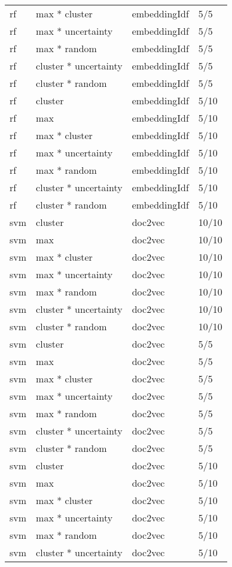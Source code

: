 \documentclass[12pt,twoside]{reedthesis}
\begin{document}
\begin{longtable}{llll}
rf & max * cluster & embeddingIdf & 5/5\\
rf & max * uncertainty & embeddingIdf & 5/5\\
\addlinespace
rf & max * random & embeddingIdf & 5/5\\
rf & cluster * uncertainty & embeddingIdf & 5/5\\
rf & cluster * random & embeddingIdf & 5/5\\
rf & cluster & embeddingIdf & 5/10\\
rf & max & embeddingIdf & 5/10\\
\addlinespace
rf & max * cluster & embeddingIdf & 5/10\\
rf & max * uncertainty & embeddingIdf & 5/10\\
rf & max * random & embeddingIdf & 5/10\\
rf & cluster * uncertainty & embeddingIdf & 5/10\\
rf & cluster * random & embeddingIdf & 5/10\\
\addlinespace
svm & cluster & doc2vec & 10/10\\
svm & max & doc2vec & 10/10\\
svm & max * cluster & doc2vec & 10/10\\
svm & max * uncertainty & doc2vec & 10/10\\
svm & max * random & doc2vec & 10/10\\
\addlinespace
svm & cluster * uncertainty & doc2vec & 10/10\\
svm & cluster * random & doc2vec & 10/10\\
svm & cluster & doc2vec & 5/5\\
svm & max & doc2vec & 5/5\\
svm & max * cluster & doc2vec & 5/5\\
\addlinespace
svm & max * uncertainty & doc2vec & 5/5\\
svm & max * random & doc2vec & 5/5\\
svm & cluster * uncertainty & doc2vec & 5/5\\
svm & cluster * random & doc2vec & 5/5\\
svm & cluster & doc2vec & 5/10\\
\addlinespace
svm & max & doc2vec & 5/10\\
svm & max * cluster & doc2vec & 5/10\\
svm & max * uncertainty & doc2vec & 5/10\\
svm & max * random & doc2vec & 5/10\\
svm & cluster * uncertainty & doc2vec & 5/10\\

\end{longtable}
\end{document}
